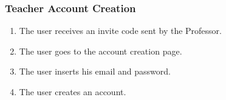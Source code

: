 \subsubsection{Teacher Account Creation}

\begin{enumerate}
    \item The user receives an invite code sent by the Professor.
    \item The user goes to the account creation page.
    \item The user inserts his email and password.
    \item The user creates an account.
\end{enumerate}